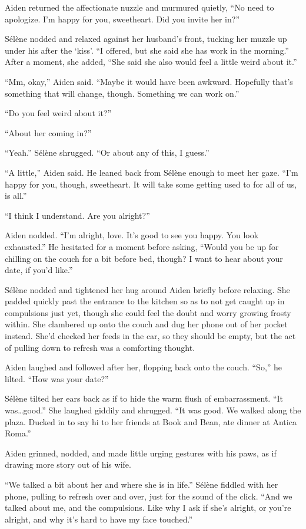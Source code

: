 Aiden returned the affectionate nuzzle and murmured quietly, ``No need to apologize. I'm happy for you, sweetheart. Did you invite her in?''

Sélène nodded and relaxed against her husband's front, tucking her muzzle up under his after the `kiss'. ``I offered, but she said she has work in the morning.'' After a moment, she added, ``She said she also would feel a little weird about it.''

``Mm, okay,'' Aiden said. ``Maybe it would have been awkward. Hopefully that's something that will change, though. Something we can work on.''

``Do you feel weird about it?''

``About her coming in?''

``Yeah.'' Sélène shrugged. ``Or about any of this, I guess.''

``A little,'' Aiden said. He leaned back from Sélène enough to meet her gaze. ``I'm happy for you, though, sweetheart. It will take some getting used to for all of us, is all.''

``I think I understand. Are you alright?''

Aiden nodded. ``I'm alright, love. It's good to see you happy. You look exhausted.'' He hesitated for a moment before asking, ``Would you be up for chilling on the couch for a bit before bed, though? I want to hear about your date, if you'd like.''

Sélène nodded and tightened her hug around Aiden briefly before relaxing. She padded quickly past the entrance to the kitchen so as to not get caught up in compulsions just yet, though she could feel the doubt and worry growing frosty within. She clambered up onto the couch and dug her phone out of her pocket instead. She'd checked her feeds in the car, so they should be empty, but the act of pulling down to refresh was a comforting thought.

Aiden laughed and followed after her, flopping back onto the couch. ``So,'' he lilted. ``How was your date?''

Sélène tilted her ears back as if to hide the warm flush of embarrassment. ``It was\ldots{}good.'' She laughed giddily and shrugged. ``It was good. We walked along the plaza. Ducked in to say hi to her friends at Book and Bean, ate dinner at Antica Roma.''

Aiden grinned, nodded, and made little urging gestures with his paws, as if drawing more story out of his wife.

``We talked a bit about her and where she is in life.'' Sélène fiddled with her phone, pulling to refresh over and over, just for the sound of the click. ``And we talked about me, and the compulsions. Like why I ask if she's alright, or you're alright, and why it's hard to have my face touched.''

